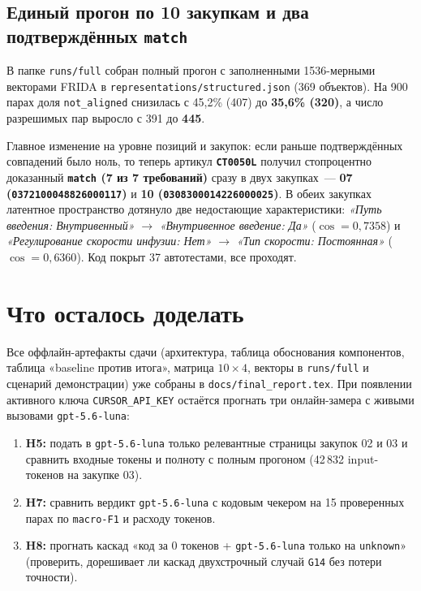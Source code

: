 \documentclass[11pt,a4paper]{article}
\begin{document}
\subsection{Единый прогон по 10 закупкам и два подтверждённых \texttt{match}}

В папке \texttt{runs/full} собран полный прогон с заполненными 1536-мерными векторами FRIDA в \texttt{representations/structured.json} (369 объектов). На 900 парах доля \texttt{not\_aligned} снизилась с 45,2\% (407) до \textbf{35,6\% (320)}, а число разрешимых пар выросло с 391 до \textbf{445}.

Главное изменение на уровне позиций и закупок: если раньше подтверждённых совпадений было ноль, то теперь артикул \textbf{\texttt{CT0050L}} получил стопроцентно доказанный \textbf{\texttt{match} (7 из 7 требований)} сразу в двух закупках~--- \textbf{07 (\texttt{0372100048826000117})} и \textbf{10 (\texttt{0308300014226000025})}. В обеих закупках латентное пространство дотянуло две недостающие характеристики: \emph{«Путь введения: Внутривенный»} $\to$ \emph{«Внутривенное введение: Да»} ($\cos = 0{,}7358$) и \emph{«Регулирование скорости инфузии: Нет»} $\to$ \emph{«Тип скорости: Постоянная»} ($\cos = 0{,}6360$). Код покрыт 37 автотестами, все проходят.

\section{Что осталось доделать}

Все оффлайн-артефакты сдачи (архитектура, таблица обоснования компонентов, таблица «baseline против итога», матрица $10 \times 4$, векторы в \texttt{runs/full} и сценарий демонстрации) уже собраны в \nolinkurl{docs/final_report.tex}. При появлении активного ключа \texttt{CURSOR\_API\_KEY} остаётся прогнать три онлайн-замера с живыми вызовами \texttt{gpt-5.6-luna}:
\begin{enumerate}
  \item \textbf{H5:} подать в \texttt{gpt-5.6-luna} только релевантные страницы закупок 02 и 03 и сравнить входные токены и полноту с полным прогоном (42\,832 input-токенов на закупке 03).
  \item \textbf{H7:} сравнить вердикт \texttt{gpt-5.6-luna} с кодовым чекером на 15 проверенных парах по \texttt{macro-F1} и расходу токенов.
  \item \textbf{H8:} прогнать каскад «код за 0 токенов + \texttt{gpt-5.6-luna} только на \texttt{unknown}» (проверить, дорешивает ли каскад двухстрочный случай \texttt{G14} без потери точности).
\end{enumerate}
\end{document}
